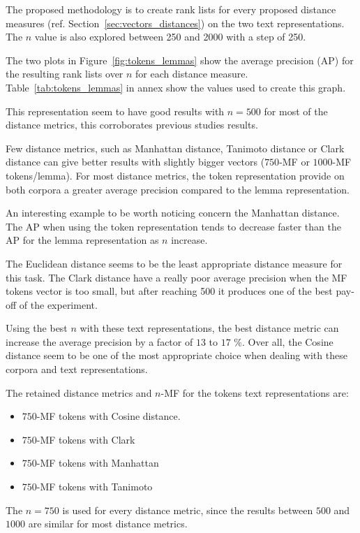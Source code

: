 The proposed methodology is to create rank lists for every proposed distance measures (ref. Section~\ref{sec:vectors_distances}) on the two text representations.
The $n$ value is also explored between 250 and 2000 with a step of 250.

The two plots in Figure~\ref{fig:tokens_lemmas} show the average precision (AP) for the resulting rank lists over $n$ for each distance measure.
Table~\ref{tab:tokens_lemmas} in annex show the values used to create this graph.

This representation seem to have good results with $n=500$ for most of the distance metrics, this corroborates previous studies results.

Few distance metrics, such as Manhattan distance, Tanimoto distance or Clark distance can give better results with slightly bigger vectors ($750$-MF or $1000$-MF tokens/lemma).
For most distance metrics, the token representation provide on both corpora a greater average precision compared to the lemma representation.

An interesting example to be worth noticing concern the Manhattan distance.
The AP when using the token representation tends to decrease faster than the AP for the lemma representation as $n$ increase.

The Euclidean distance seems to be the least appropriate distance measure for this task.
The Clark distance have a really poor average precision when the MF tokens vector is too small, but after reaching 500 it produces one of the best pay-off of the experiment.

Using the best $n$ with these text representations, the best distance metric can increase the average precision by a factor of $13$ to $17$ \%.
Over all, the Cosine distance seem to be one of the most appropriate choice when dealing with these corpora and text representations.

The retained distance metrics and $n$-MF for the tokens text representations are:
\begin{itemize}
  \item $750$-MF tokens with Cosine distance.
  \item $750$-MF tokens with Clark
  \item $750$-MF tokens with Manhattan
  \item $750$-MF tokens with Tanimoto
\end{itemize}

The $n = 750$ is used for every distance metric, since the results between $500$ and $1000$ are similar for most distance metrics.

